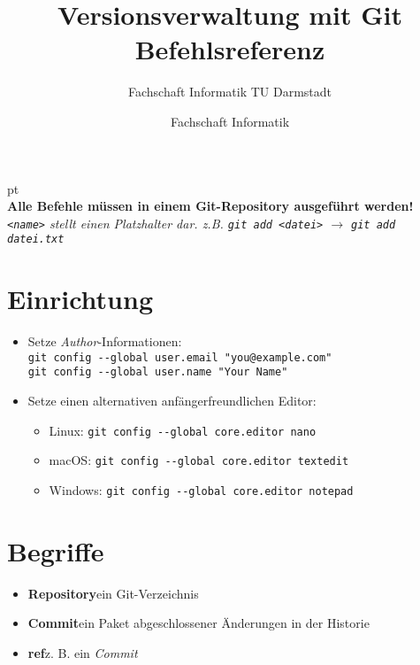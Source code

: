 \documentclass[accentcolor=tud8b,colorbacktitle,12pt]{tudexercise}
\author{Fachschaft Informatik}
\begin{document}
\title{Versionsverwaltung mit Git\\Befehlsreferenz}
\subtitle{Fachschaft Informatik TU Darmstadt}
\maketitle

 pt\\
\textbf{Alle Befehle müssen in einem Git-Repository ausgeführt werden!}\\
\textit{\lstinline|<name>| stellt einen Platzhalter dar. z.B. \lstinline|git add <datei>| $\rightarrow$ \lstinline|git add datei.txt|}
\section*{Einrichtung}
\begin{itemize}
	\item Setze \textit{Author}-Informationen:\\
	\lstinline|git config --global user.email "you@example.com"|\\
	\lstinline|git config --global user.name "Your Name"|

	\item Setze einen alternativen anfängerfreundlichen Editor:
	\begin{itemize}
		\item Linux: \tab\lstinline|git config --global core.editor nano|
		\item macOS: \tab\lstinline|git config --global core.editor textedit|
		\item Windows: \tab\lstinline|git config --global core.editor notepad|
	\end{itemize}
\end{itemize}

\section*{Begriffe}
\begin{itemize}
	\item \textbf{Repository}\tab ein Git-Verzeichnis
	\item \textbf{Commit}\tab ein Paket abgeschlossener Änderungen in der Historie
	\item \textbf{ref}\tab z. B. ein \textit{Commit}
\end{itemize}
\end{document}
